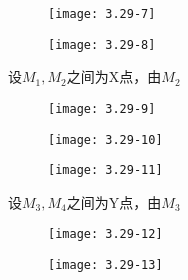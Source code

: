 		\begin{figure}[H] %
	\begin{minipage}{\linewidth}
		\texttt{[image: 3.29-7]}
	\end{minipage}
\end{figure}

		\begin{figure}[H] %
	\begin{minipage}{\linewidth}
		\texttt{[image: 3.29-8]}
	\end{minipage}
\end{figure}

设$M_1,M_2$之间为X点，由$M_2$

		\begin{figure}[H] %
	\begin{minipage}{\linewidth}
		\texttt{[image: 3.29-9]}
	\end{minipage}
\end{figure}

		\begin{figure}[H] %
	\begin{minipage}{\linewidth}
		\texttt{[image: 3.29-10]}
	\end{minipage}
\end{figure}

		\begin{figure}[H] %
	\begin{minipage}{\linewidth}
		\texttt{[image: 3.29-11]}
	\end{minipage}
\end{figure}

设$M_3,M_4$之间为Y点，由$M_3$

		\begin{figure}[H] %
	\begin{minipage}{\linewidth}
		\texttt{[image: 3.29-12]}
	\end{minipage}
\end{figure}


		\begin{figure}[H] %
	\begin{minipage}{\linewidth}
		\texttt{[image: 3.29-13]}
	\end{minipage}
\end{figure}


